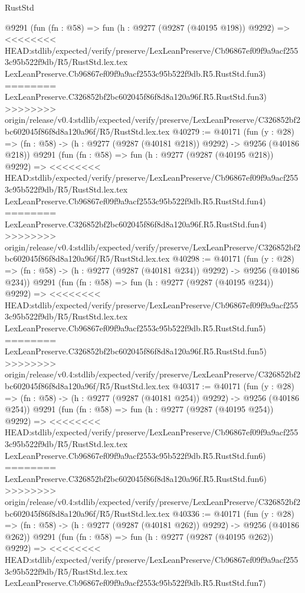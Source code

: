 \begin{lexlean}{RustStd}
\begin{coremodule}
{\begin{coremodule}
{{{{{{{{{{{{{{{{{{{{{{{{{{{{{{{{{{{{{{{{{{{{{{{{{{{{{{{    @9291
    (fun (fn : @58) =>
    fun (h : @9277 (@9287 (@40195 @198)) @9292) =>
<<<<<<<< HEAD:stdlib/expected/verify/preserve/LexLeanPreserve/Cb96867ef09f9a9acf2553c95b522f9db/R5/RustStd.lex.tex
    LexLeanPreserve.Cb96867ef09f9a9acf2553c95b522f9db.R5.RustStd.fun3)
========
    LexLeanPreserve.C326852bf2bc602045f86f8d8a120a96f.R5.RustStd.fun3)
>>>>>>>> origin/release/v0.4:stdlib/expected/verify/preserve/LexLeanPreserve/C326852bf2bc602045f86f8d8a120a96f/R5/RustStd.lex.tex
@40279 := @40171
    (fun (y : @28) => (fn : @58) -> (h : @9277 (@9287 (@40181 @218)) @9292) -> @9256 (@40186 @218))
    @9291
    (fun (fn : @58) =>
    fun (h : @9277 (@9287 (@40195 @218)) @9292) =>
<<<<<<<< HEAD:stdlib/expected/verify/preserve/LexLeanPreserve/Cb96867ef09f9a9acf2553c95b522f9db/R5/RustStd.lex.tex
    LexLeanPreserve.Cb96867ef09f9a9acf2553c95b522f9db.R5.RustStd.fun4)
========
    LexLeanPreserve.C326852bf2bc602045f86f8d8a120a96f.R5.RustStd.fun4)
>>>>>>>> origin/release/v0.4:stdlib/expected/verify/preserve/LexLeanPreserve/C326852bf2bc602045f86f8d8a120a96f/R5/RustStd.lex.tex
@40298 := @40171
    (fun (y : @28) => (fn : @58) -> (h : @9277 (@9287 (@40181 @234)) @9292) -> @9256 (@40186 @234))
    @9291
    (fun (fn : @58) =>
    fun (h : @9277 (@9287 (@40195 @234)) @9292) =>
<<<<<<<< HEAD:stdlib/expected/verify/preserve/LexLeanPreserve/Cb96867ef09f9a9acf2553c95b522f9db/R5/RustStd.lex.tex
    LexLeanPreserve.Cb96867ef09f9a9acf2553c95b522f9db.R5.RustStd.fun5)
========
    LexLeanPreserve.C326852bf2bc602045f86f8d8a120a96f.R5.RustStd.fun5)
>>>>>>>> origin/release/v0.4:stdlib/expected/verify/preserve/LexLeanPreserve/C326852bf2bc602045f86f8d8a120a96f/R5/RustStd.lex.tex
@40317 := @40171
    (fun (y : @28) => (fn : @58) -> (h : @9277 (@9287 (@40181 @254)) @9292) -> @9256 (@40186 @254))
    @9291
    (fun (fn : @58) =>
    fun (h : @9277 (@9287 (@40195 @254)) @9292) =>
<<<<<<<< HEAD:stdlib/expected/verify/preserve/LexLeanPreserve/Cb96867ef09f9a9acf2553c95b522f9db/R5/RustStd.lex.tex
    LexLeanPreserve.Cb96867ef09f9a9acf2553c95b522f9db.R5.RustStd.fun6)
========
    LexLeanPreserve.C326852bf2bc602045f86f8d8a120a96f.R5.RustStd.fun6)
>>>>>>>> origin/release/v0.4:stdlib/expected/verify/preserve/LexLeanPreserve/C326852bf2bc602045f86f8d8a120a96f/R5/RustStd.lex.tex
@40336 := @40171
    (fun (y : @28) => (fn : @58) -> (h : @9277 (@9287 (@40181 @262)) @9292) -> @9256 (@40186 @262))
    @9291
    (fun (fn : @58) =>
    fun (h : @9277 (@9287 (@40195 @262)) @9292) =>
<<<<<<<< HEAD:stdlib/expected/verify/preserve/LexLeanPreserve/Cb96867ef09f9a9acf2553c95b522f9db/R5/RustStd.lex.tex
    LexLeanPreserve.Cb96867ef09f9a9acf2553c95b522f9db.R5.RustStd.fun7)
}}}}}}}}}}}}}}}}}}}}}}}}}}}}}}}}}}}}}}}}}}}}}}}}}}}}}}}
\end{coremodule}}
\end{coremodule}
\end{lexlean}
